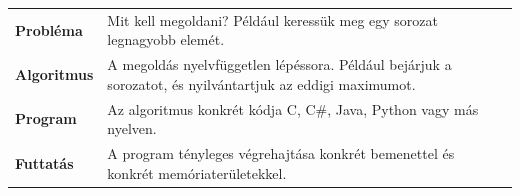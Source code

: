 \begin{tabularx}{\textwidth}{>{\bfseries}lX}
Probléma & Mit kell megoldani? Például keressük meg egy sorozat legnagyobb elemét. \\
Algoritmus & A megoldás nyelvfüggetlen lépéssora. Például bejárjuk a sorozatot, és nyilvántartjuk az eddigi maximumot. \\
Program & Az algoritmus konkrét kódja C, C\#, Java, Python vagy más nyelven. \\
Futtatás & A program tényleges végrehajtása konkrét bemenettel és konkrét memóriaterületekkel. \\
\end{tabularx}
